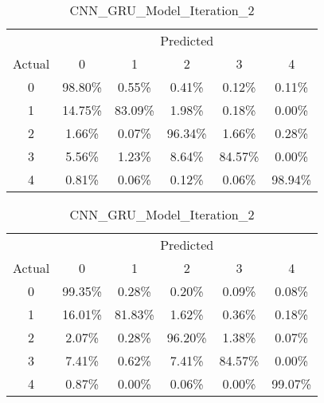 \vspace{1em}

\begin{table}[ht]
    \centering
    \caption{Normalized Confusion Matrices in Percent (Iteration 2)}
    \label{tab:conf_matrices_it2}
    \begin{minipage}{0.32\textwidth}
        \caption*{CNN\_Model\_Iteration\_2}
        \begin{tabular}{cccccc}
            \toprule
            & \multicolumn{5}{c}{Predicted} \\
            \cmidrule(lr){2-6}
            Actual & 0 & 1 & 2 & 3 & 4 \\
            \midrule
            0 & 98.80\% & 0.55\% & 0.41\% & 0.12\% & 0.11\% \\
            1 & 14.75\% & 83.09\% & 1.98\% & 0.18\% & 0.00\% \\
            2 & 1.66\%  & 0.07\% & 96.34\% & 1.66\% & 0.28\% \\
            3 & 5.56\%  & 1.23\% & 8.64\%  & 84.57\% & 0.00\% \\
            4 & 0.81\%  & 0.06\% & 0.12\%  & 0.06\% & 98.94\% \\
            \bottomrule
        \end{tabular}
    \end{minipage}
    \hfill
    \begin{minipage}{0.32\textwidth}
        \caption*{CNN\_LSTM\_Model\_Iteration\_2}
        \begin{tabular}{cccccc}
            \toprule
            & \multicolumn{5}{c}{Predicted} \\
            \cmidrule(lr){2-6}
            Actual & 0 & 1 & 2 & 3 & 4 \\
            \midrule
            0 & 99.35\% & 0.28\% & 0.20\% & 0.09\% & 0.08\% \\
            1 & 16.01\% & 81.83\% & 1.62\% & 0.36\% & 0.18\% \\
            2 & 2.07\%  & 0.28\% & 96.20\% & 1.38\% & 0.07\% \\
            3 & 7.41\%  & 0.62\% & 7.41\%  & 84.57\% & 0.00\% \\
            4 & 0.87\%  & 0.00\% & 0.06\%  & 0.00\% & 99.07\% \\
            \bottomrule
        \end{tabular}
    \end{minipage}
    \hfill
    \begin{minipage}{0.32\textwidth}
        \caption*{CNN\_GRU\_Model\_Iteration\_2}

\end{minipage}
\end{table}
